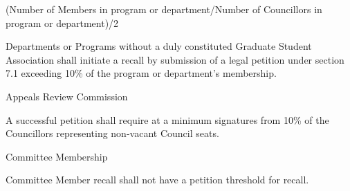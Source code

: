 \begin{longenum}[ label*=\thesubsection.\arabic*., align=left]
\begin{longenum}[ label*=\arabic*., align=left]
(Number of Members in program or department/Number of Councillors in program or department)/2
	\item Departments or Programs without a duly constituted Graduate Student Association shall initiate a recall by submission of a legal petition under section 7.1 exceeding 10\% of the program or department's membership.
	\end{longenum}    
	\item Appeals Review Commission
    \begin{longenum}[ label*=\arabic*., align=left]
		\item A successful petition shall require at a minimum signatures from 10\% of the Councillors representing non-vacant Council seats.
	\end{longenum}
    \item{Committee Membership}
    \begin{longenum}[ label*=\arabic*., align=left]
    \item Committee Member recall shall not have a petition threshold for recall. 
    \end{longenum}
\end{longenum}

